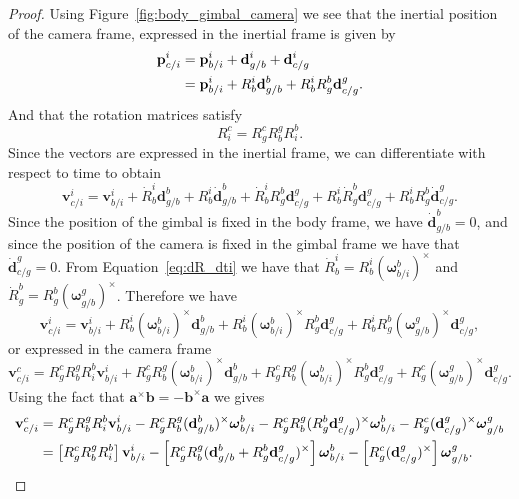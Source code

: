 \begin{proof}
Using Figure~\ref{fig:body_gimbal_camera} we see that the inertial position of the camera frame, expressed in the inertial frame is given by
\begin{align}
\pbf_{c/i}^i &= \pbf_{b/i}^i + \dbf_{g/b}^i + \dbf_{c/g}^i \notag \\
&= \pbf_{b/i}^i + R_b^i\dbf_{g/b}^b + R_b^i R_g^b \dbf_{c/g}^g. \label{eq:pos_camera_inertial}
\end{align}
And that the rotation matrices satisfy
\[
R_i^c = R_g^c R_b^g R_i^b.
\]
Since the vectors are expressed in the inertial frame, we can differentiate with respect to time to obtain
\[
\mathbf{v}_{c/i}^i = \mathbf{v}_{b/i}^i + \dot{R}_b^i\mathbf{d}_{g/b}^b + R_b^i\dot{\mathbf{d}}_{g/b}^b 
+ \dot{R}_b^i R_g^b \mathbf{d}_{c/g}^g + R_b^i \dot{R}_g^b \mathbf{d}_{c/g}^g + R_b^i R_g^b \dot{\mathbf{d}}_{c/g}^g.
\]
Since the position of the gimbal is fixed in the body frame, we have $\dot{\mathbf{d}}_{g/b}^b=0$, and since the position of the camera is fixed in the gimbal frame we have that $\dot{\mathbf{d}}_{c/g}^g=0$.  From Equation~\eqref{eq:dR_dti} we have that $\dot{R}_b^i=R_b^i(\boldsymbol{\omega}_{b/i}^b)^\times$ and $\dot{R}_g^b = R_g^b (\boldsymbol{\omega}_{g/b}^g)^\times$.  Therefore we have 
\[
\mathbf{v}_{c/i}^i = \mathbf{v}_{b/i}^i + R_b^i(\boldsymbol{\omega}_{b/i}^b)^\times\mathbf{d}_{g/b}^b  
+ R_b^i(\boldsymbol{\omega}_{b/i}^b)^\times R_g^b \mathbf{d}_{c/g}^g + R_b^i R_g^b (\boldsymbol{\omega}_{g/b}^g)^\times \mathbf{d}_{c/g}^g,
\]
or expressed in the camera frame
\[
\mathbf{v}_{c/i}^c = R_g^c R_b^g R_i^b\mathbf{v}_{b/i}^i + R_g^c R_b^g(\boldsymbol{\omega}_{b/i}^b)^\times\mathbf{d}_{g/b}^b  
+ R_g^c R_b^g(\boldsymbol{\omega}_{b/i}^b)^\times R_g^b \mathbf{d}_{c/g}^g + R_g^c (\boldsymbol{\omega}_{g/b}^g)^\times \mathbf{d}_{c/g}^g.
\]
Using the fact that $\mathbf{a}^\times \mathbf{b} = - \mathbf{b}^\times \mathbf{a}$ we gives
\begin{align}
\mathbf{v}_{c/i}^c &= R_g^c R_b^g R_i^b \mathbf{v}_{b/i}^i - R_g^c R_b^g(\mathbf{d}_{g/b}^b)^\times \boldsymbol{\omega}_{b/i}^b  
- R_g^c R_b^g(R_g^b \mathbf{d}_{c/g}^g)^\times \boldsymbol{\omega}_{b/i}^b  - R_g^c (\mathbf{d}_{c/g}^g)^\times \boldsymbol{\omega}_{g/b}^g \notag \\
&= \left[R_g^c R_b^g R_i^b\right]\mathbf{v}_{b/i}^i - \left[ R_g^c R_b^g(\mathbf{d}_{g/b}^b+R_g^b \mathbf{d}_{c/g}^g)^\times \right] \boldsymbol{\omega}_{b/i}^b  
- \left[R_g^c (\mathbf{d}_{c/g}^g)^\times \right] \boldsymbol{\omega}_{g/b}^g. \label{eq:v_c_^c}
\end{align}


\end{proof}
